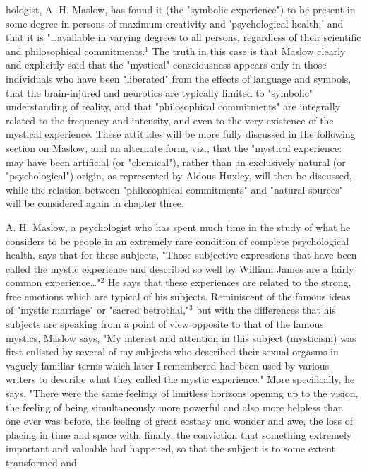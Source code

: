 \noindent hologist, A. H. Maslow,
has found it (the "symbolic experience") to be present in some degree
in persons of maximum creativity and 'psychological health,' and that it is "\dots available in varying degrees
to all persons, regardless of their scientific and philosophical commitments.$^{1}$ The truth in
this case is that Maslow clearly and explicitly said that the "mystical" consciousness
appears only in those individuals who have been "liberated" from the effects of
language and symbols, that the brain-injured and neurotics are typically limited
to "symbolic" understanding of reality, and that "philosophical commitments"
are integrally related to the frequency and intensity, and even to the very existence
of the mystical experience. These attitudes will be more fully discussed in the
following section on Maslow, and an alternate form, viz.,
that the "mystical experience: may have been artificial (or "chemical"), rather than
an exclusively natural (or "psychological") origin, as represented by Aldous Huxley, will then
be discussed, while the relation between "philosophical commitments" and "natural sources"
will be considered again in chapter three.\par
\vspace*{0.5\baselineskip}
A. H. Maslow, a psychologist who has spent much time in the
study of what he considers to be people in an extremely rare condition
of complete psychological health, says that for these subjects, "Those
subjective expressions that have been called the mystic experience and described so well by
William James are a fairly common experience\dots"$^{2}$ He says
that these experiences are related to the strong, free emotions which
are typical of his subjects. Reminiscent of the famous ideas of
"mystic marriage" or "sacred betrothal,"$^{3}$ but with
the differences that his subjects are speaking from a point of view
opposite to that of the famous mystics, Maslow says, "My interest and attention
in this subject (mysticism) was first enlisted by several of my subjects who described their
sexual orgasms in vaguely familiar terms which later I remembered had been used by
various writers to describe what they called the mystic experience." More specifically,
he says, "There were the same feelings of limitless horizons opening up to the vision,
the feeling of being simultaneously more powerful and also more helpless than one ever
was before, the feeling of great ecstasy and wonder and awe, the loss of placing
in time and space with, finally, the conviction that something extremely important and
valuable had happened, so that the subject is to some extent transformed and

